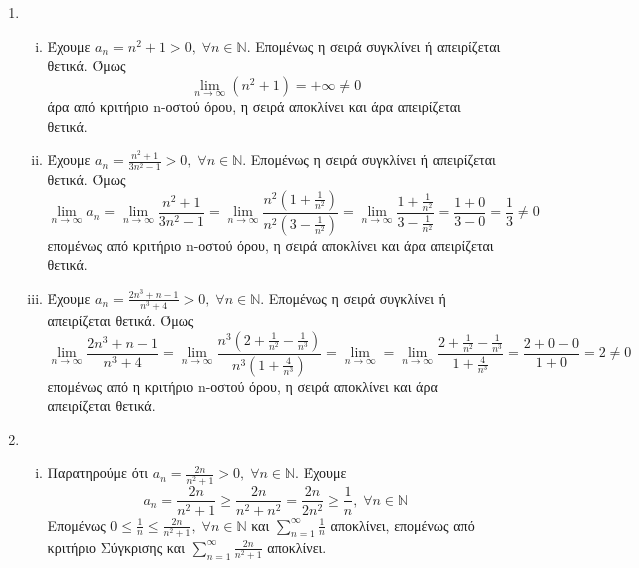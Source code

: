 \documentclass[a4paper,table]{report}
\begin{document}
\begin{center}
  \minibox[c]{\large \bfseries  \textcolor{Col1}{Σειρές (Ασκήσεις)} \\ 
  \large \bfseries \textcolor{Col1}{(λύσεις)}}
\end{center}

\vspace{\baselineskip}

\begin{enumerate}
  \item 
    \begin{enumerate}[i)]
      \item Έχουμε $ a_{n}= n^{2}+1 > 0, \; \forall n \in 
        \mathbb{N} $. Επομένως η σειρά συγκλίνει ή απειρίζεται θετικά.
        Όμως
        \[ \lim_{n \to \infty} (n^{2}+1) = + \infty \neq 0 \] άρα από 
        κριτήριο n-οστού όρου, η σειρά αποκλίνει και άρα απειρίζεται θετικά.
      \item Έχουμε $ a_{n}= \frac{n^{2}+1}{3n^{2}-1} > 0, \; \forall n \in 
        \mathbb{N} $. Επομένως η σειρά συγκλίνει ή απειρίζεται θετικά.
        Όμως \[ \lim_{n \to \infty} a_{n} = \lim_{n \to \infty} 
          \frac{n^{2}+1}{3n^{2}-1} = \lim_{n \to \infty} 
          \frac{n^{2}(1+ \frac{1}{n^{{2}}})}{n^{2}(3- \frac{1}{n^{2}})} = 
          \lim_{n \to \infty} \frac{1 + \frac{1}{n^{2}}}{3- \frac{1}{n^{2}}} = 
          \frac{1+0}{3-0} = \frac{1}{3} \neq 0
        \] επομένως από κριτήριο n-οστού όρου, η σειρά αποκλίνει και άρα απειρίζεται 
        θετικά.

      \item Έχουμε $ a_{n}= \frac{2n^{3}+n-1}{n^{3}+4} > 0, \; \forall n \in 
        \mathbb{N} $. Επομένως η σειρά συγκλίνει ή απειρίζεται θετικά.
        Όμως
        \[
          \lim_{n \to \infty} \frac{2n^{3}+n-1}{n^{3}+4} = \lim_{n \to \infty}
          \frac{n^{3}(2+ \frac{1}{n^{2}}- \frac{1}{n^{3}})}{n^{3}
          (1+ \frac{4}{n^{3}})} = \lim_{n \to \infty} = 
          \lim_{n \to \infty} \frac{2+ \frac{1}{n^{2}}- 
          \frac{1}{n^{3}}}{1 + \frac{4}{n^{3}}} =  
          \frac{2+0-0}{1+0} = 2 \neq 0
        \]
        επομένως από η κριτήριο n-οστού όρου, η σειρά αποκλίνει και 
        άρα απειρίζεται θετικά. 
    \end{enumerate}

  \item 
    \begin{enumerate}[i)]
      \item Παρατηρούμε ότι $ a_{n} = \frac{2n}{n^{2}+1} > 0, \; \forall n \in 
        \mathbb{N} $.  Έχουμε 
        \[
          a_{n} = \frac{2n}{n^{2}+1} \geq \frac{2n}{n^{2}+n^{2}} = 
          \frac{2n}{2n^{2}} \geq \frac{1}{n}, \; \forall n \in \mathbb{N} 
        \] 
        Επομένως $ 0 \leq \frac{1}{n} \leq \frac{2n}{n^{2}+1}, \; 
        \forall n \in \mathbb{N} $ και $ \sum_{n=1}^{\infty} \frac{1}{n} $ 
        αποκλίνει, επομένως από κριτήριο Σύγκρισης και $ \sum_{n=1}^{\infty} 
        \frac{2n}{n^{2}+1} $ αποκλίνει.


\end{enumerate}
\end{enumerate}
\end{document}
